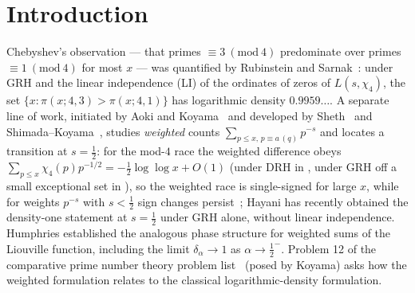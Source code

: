 \documentclass[11pt]{article}
\newcommand{\loglog}{\log\log}
\begin{document}
\begin{abstract}
and lies in
$(\tfrac12,1)$, the map $m\mapsto\delta_\chi(m)$ is continuous, and
$1-\delta_\chi(m)\le\exp\bigl(-1/(2C(\chi)(2m+1)^2)\bigr)$ with
$C(\chi)=\sum_{\gamma>0}2\gamma^{-2}$ evaluated in closed form
($C(\chi_4)=0.1560296\ldots$, $C(\chi_3)=0.1134021\ldots$), so
$\delta_\chi(m)\to1$ as $m\to-\tfrac12^{\,+}$. Two further theorems
complete the picture: the dissolution asymptotic holds
\emph{uniformly} over all real primitive characters and all
$M=m+\tfrac12\ge\delta_0$ (any fixed $\delta_0>0$, with effective
constants; only the corner $m\to-\tfrac12$ jointly with $q\to\infty$
is left open), and $m\mapsto\delta_\chi(m)$ is \emph{strictly
decreasing} for $m\ge16.82$ ($q=4$; $18.62$ for $q=3$), so beyond
these thresholds Chebyshev's bias dissolves monotonically. The
constants $C(\chi)$, every variance $\sigma_m^2$, the positivity of
the central $L$-values, and the completeness of the zero lists
underlying the numerics are machine-certified in ball arithmetic.
This exhibits the classical density formulation
($m=0$) and the weighted formulation of Aoki--Koyama ($m=-\tfrac12$) as
the two ends of one continuous, quantitatively controlled family --- a
conditional structural connection between, though not a logical
inclusion between, the two definitions compared in Problem 12 of the
comparative prime number theory problem list of Hamieh, Kadiri, Martin
and Ng, which remains open.
\end{abstract}

\section{Introduction}

Chebyshev's observation --- that primes $\equiv3\ (\mathrm{mod}\ 4)$
predominate over primes $\equiv1\ (\mathrm{mod}\ 4)$ for most $x$ ---
was quantified by Rubinstein and Sarnak~\cite{RS94}: under GRH and the
linear independence (LI) of the ordinates of zeros of $L(s,\chi_4)$,
the set $\{x:\pi(x;4,3)>\pi(x;4,1)\}$ has logarithmic density
$0.9959\ldots$. A separate line of work, initiated by Aoki and
Koyama~\cite{AK23} and developed by Sheth~\cite{Sheth24} and
Shimada--Koyama~\cite{SK25}, studies \emph{weighted} counts
$\sum_{p\le x,\,p\equiv a\,(q)}p^{-s}$ and locates a transition at
$s=\tfrac12$: for the mod-$4$ race the weighted difference obeys
$\sum_{p\le x}\chi_4(p)p^{-1/2}=-\tfrac12\loglog x+O(1)$ (under DRH in
\cite{AK23}, under GRH off a small exceptional set in \cite{Sheth24}),
so the weighted race is single-signed for large $x$, while for weights
$p^{-s}$ with $s<\tfrac12$ sign changes persist~\cite{SK25}; Hayani
\cite{Hay25} has recently obtained the density-one statement at
$s=\tfrac12$ under GRH alone, without linear independence. Humphries
\cite{Hum13} established the analogous phase structure for weighted
sums of the Liouville function, including the limit
$\delta_\alpha\to1$ as $\alpha\to\tfrac12^-$. Problem 12 of the
comparative prime number theory problem list~\cite{HKMN24} (posed by
Koyama) asks how the weighted formulation relates to the classical
logarithmic-density formulation.
\end{document}
